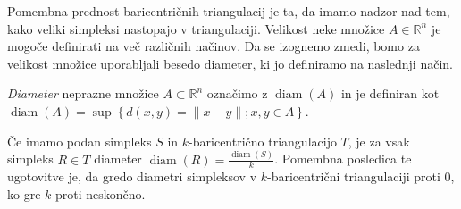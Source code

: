 \documentclass[mat1]{fmfdelo}
\newcommand{\R}{\mathbb R}
\DeclareMathOperator{\diam}{diam}
\newcommand{\0}{\underline{0}}
\begin{document}
Pomembna prednost baricentričnih triangulacij je ta, da imamo nadzor nad tem, kako veliki simpleksi nastopajo v triangulaciji. Velikost neke množice $A \in \R^n$ je mogoče definirati na več različnih načinov. Da se izognemo zmedi, bomo za velikost množice uporabljali besedo diameter, ki  jo definiramo na naslednji način.
\begin{definicija}
\emph{Diameter} neprazne množice $A \subset \R^n$ označimo z $\diam(A)$ in je definiran kot $\diam(A) = \sup \left \{ d(x, y) = \| x - y \|; x, y \in A \right \}$.
\end{definicija}
Če imamo podan simpleks $S$ in $k$-baricentrično triangulacijo $T$, je za vsak simpleks $R \in T$ diameter $\diam(R) = \frac{\diam(S)}{k}$. Pomembna posledica te ugotovitve je, da gredo diametri simpleksov v $k$-baricentrični triangulaciji proti $0$, ko gre $k$ proti neskončno.
\end{document}
